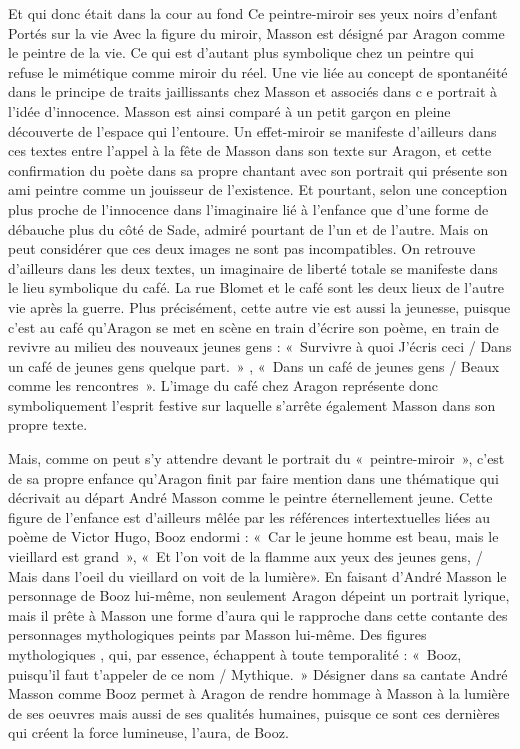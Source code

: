Et qui donc était dans la cour au fond
Ce peintre-miroir ses yeux noirs d’enfant
Portés sur la vie
	Avec la figure du miroir, Masson est désigné par Aragon comme le peintre de la vie. Ce qui est d’autant plus symbolique chez un peintre qui refuse le mimétique comme miroir du réel. Une vie  liée au concept de spontanéité dans le principe de traits jaillissants chez Masson et associés dans c e portrait à l’idée d’innocence. Masson est ainsi comparé à un petit garçon en pleine découverte de l’espace qui l’entoure. Un effet-miroir se manifeste d’ailleurs dans ces textes entre l’appel à la fête de Masson dans son texte sur Aragon, et cette confirmation du poète dans sa propre chantant avec son portrait qui présente son ami peintre comme un jouisseur de l’existence. Et pourtant, selon une conception plus proche de l’innocence dans l’imaginaire lié à l’enfance que d’une forme de débauche plus du côté de Sade, admiré pourtant de l’un et de l’autre. Mais on peut considérer que ces deux images ne sont pas incompatibles. On retrouve d’ailleurs dans les deux textes, un imaginaire de liberté totale se manifeste dans le lieu symbolique du café. La rue Blomet et le café sont les deux lieux de l’autre vie après la guerre. Plus précisément, cette autre vie est aussi la jeunesse, puisque c’est au café qu’Aragon se met en scène en train d’écrire son poème, en train de revivre au milieu des nouveaux jeunes gens : « Survivre à quoi J’écris ceci / Dans un café de jeunes gens quelque part. » , « Dans un café de jeunes gens / Beaux comme les rencontres ». L’image du café chez Aragon représente donc symboliquement l’esprit festive sur laquelle s’arrête également Masson dans son propre texte. 

	 Mais, comme on peut s’y attendre devant le portrait du « peintre-miroir »,  c’est de sa propre enfance qu’Aragon finit par faire mention dans une thématique qui décrivait au départ André Masson comme le peintre éternellement jeune. Cette figure de l’enfance est d’ailleurs mêlée par les références intertextuelles liées au  poème de Victor Hugo, Booz endormi : « Car le jeune homme est beau, mais le vieillard est grand », « Et l'on voit de la flamme aux yeux des jeunes gens, / Mais dans l’oeil du vieillard on voit de la lumière». En faisant d’André Masson le personnage de Booz lui-même, non seulement Aragon dépeint un portrait lyrique, mais il prête à Masson une forme d’aura qui le rapproche dans cette contante des personnages mythologiques peints par Masson lui-même. Des figures mythologiques , qui, par essence, échappent à toute temporalité :  « Booz, puisqu'il faut t’appeler de ce nom / Mythique. » Désigner dans sa cantate André Masson comme Booz permet à Aragon de rendre hommage à Masson à la lumière de ses oeuvres mais aussi de ses qualités humaines, puisque ce sont ces dernières qui créent la force lumineuse, l’aura, de Booz. 

